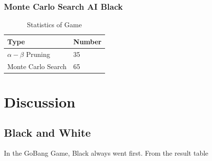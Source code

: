 \documentclass[11pt, a4paper]{article}
\begin{document}
\subsubsection{Monte Carlo Search AI Black}

\begin{table}[htbp] 
	\begin{center}
		\caption{Statistics of Game}
		\begin{tabular}{|l|l|} \hline
			Type & Number  \\ \hline
			$\alpha-\beta$ Pruning  & 35   \\ \hline
			Monte Carlo Search &   65 \\ \hline
			
		\end{tabular}
		
		\label{tab:r-2}
	\end{center}
\end{table}


\section{Discussion}

\subsection{Black and White}

In the GoBang Game, Black always went first. From the result table  










  
% 





\end{document}
